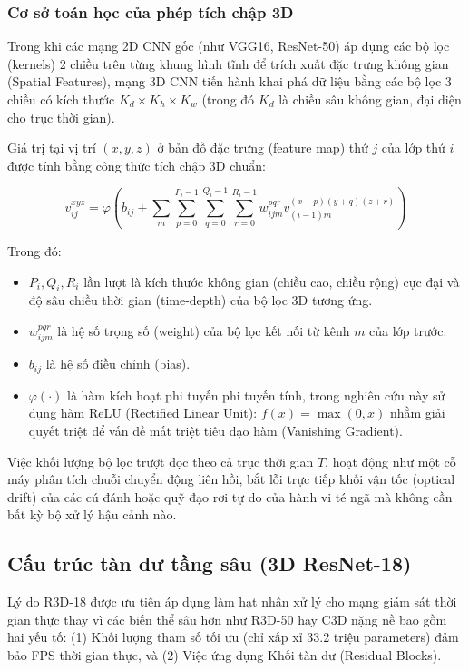 \documentclass[conference]{IEEEtran}
\begin{document}
\subsubsection{Cơ sở toán học của phép tích chập 3D}
Trong khi các mạng 2D CNN gốc (như VGG16, ResNet-50) áp dụng các bộ lọc (kernels) 2 chiều trên từng khung hình tĩnh để trích xuất đặc trưng không gian (Spatial Features), mạng 3D CNN tiến hành khai phá dữ liệu bằng các bộ lọc 3 chiều có kích thước $K_d \times K_h \times K_w$ (trong đó $K_d$ là chiều sâu không gian, đại diện cho trục thời gian). 

Giá trị tại vị trí $(x, y, z)$ ở bản đồ đặc trưng (feature map) thứ $j$ của lớp thứ $i$ được tính bằng công thức tích chập 3D chuẩn:

\begin{equation}
    v_{ij}^{xyz} = \varphi \left( b_{ij} + \sum_m \sum_{p=0}^{P_i-1} \sum_{q=0}^{Q_i-1} \sum_{r=0}^{R_i-1} w_{ijm}^{pqr} v_{(i-1)m}^{(x+p)(y+q)(z+r)} \right)
\end{equation}

Trong đó:
\begin{itemize}
    \item $P_i, Q_i, R_i$ lần lượt là kích thước không gian (chiều cao, chiều rộng) cực đại và độ sâu chiều thời gian (time-depth) của bộ lọc 3D tương ứng.
    \item $w_{ijm}^{pqr}$ là hệ số trọng số (weight) của bộ lọc kết nối từ kênh $m$ của lớp trước.
    \item $b_{ij}$ là hệ số điều chỉnh (bias).
    \item $\varphi(\cdot)$ là hàm kích hoạt phi tuyến phi tuyến tính, trong nghiên cứu này sử dụng hàm ReLU (Rectified Linear Unit): $f(x) = \max(0, x)$ nhằm giải quyết triệt để vấn đề mất triệt tiêu đạo hàm (Vanishing Gradient).
\end{itemize}

Việc khối lượng bộ lọc trượt dọc theo cả trục thời gian $T$, hoạt động như một cỗ máy phân tích chuỗi chuyển động liên hồi, bắt lỗi trực tiếp khối vận tốc (optical drift) của các cú đánh hoặc quỹ đạo rơi tự do của hành vi té ngã mà không cần bất kỳ bộ xử lý hậu cảnh nào. 

\subsection{Cấu trúc tàn dư tầng sâu (3D ResNet-18)}
Lý do R3D-18 được ưu tiên áp dụng làm hạt nhân xử lý cho mạng giám sát thời gian thực thay vì các biến thể sâu hơn như R3D-50 hay C3D nặng nề bao gồm hai yếu tố: (1) Khối lượng tham số tối ưu (chỉ xấp xỉ 33.2 triệu parameters) đảm bảo FPS thời gian thực, và (2) Việc ứng dụng Khối tàn dư (Residual Blocks).
\end{document}
